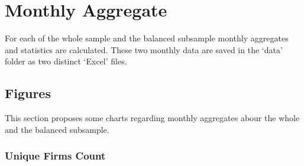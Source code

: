 \documentclass[12pt]{article}
\begin{document}
    \section{Monthly Aggregate}
    For each of the whole sample and the balanced subsample monthly aggregates and statistics are calculated. These two monthly data are saved in the `data' folder as two distinct `Excel' files.

    \subsection{Figures}
    This section proposes some charts regarding monthly aggregates abour the whole and the balanced subsample.

    \subsubsection{Unique Firms Count}
\end{document}
